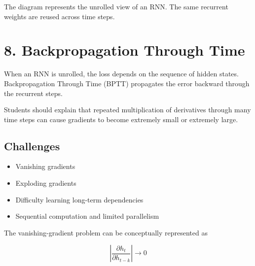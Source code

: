 \documentclass[10pt]{article}
\begin{document}
The diagram represents the unrolled view of an RNN. The same recurrent weights
are reused across time steps.

\section*{8. Backpropagation Through Time}

When an RNN is unrolled, the loss depends on the sequence of hidden states.
Backpropagation Through Time (BPTT) propagates the error backward through
the recurrent steps.

\begin{center}
\end{center}

Students should explain that repeated multiplication of derivatives through
many time steps can cause gradients to become extremely small or extremely
large.

\subsection*{Challenges}

\begin{itemize}
\item Vanishing gradients
\item Exploding gradients
\item Difficulty learning long-term dependencies
\item Sequential computation and limited parallelism
\end{itemize}

The vanishing-gradient problem can be conceptually represented as

\[
\left|\frac{\partial h_t}{\partial h_{t-k}}\right|\rightarrow0
\]
\end{document}
